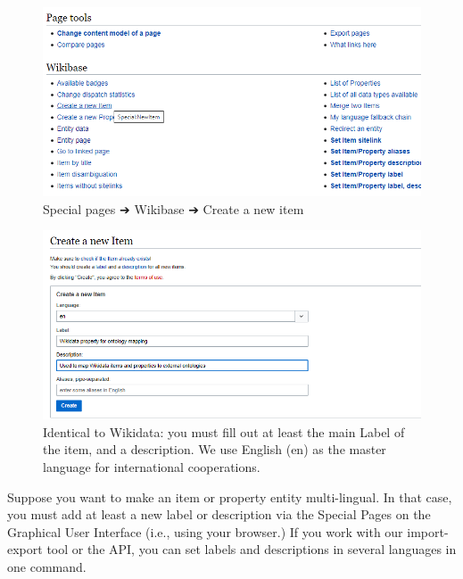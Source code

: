\documentclass[
  letterpaper,
  DIV=11,
  numbers=noendperiod]{scrreprt}
\begin{document}
\begin{figure}[H]

{\centering \includegraphics{png/wikibase/edit/create_new_item-1.png}

}

\caption{Special pages ➔ Wikibase ➔ Create a new item}

\end{figure}%
\begin{figure}[H]

{\centering \includegraphics{png/wikibase/edit/create_new_item-2.png}

}

\caption{Identical to Wikidata: you must fill out at least the main
Label of the item, and a description. We use English (en) as the master
language for international cooperations.}

\end{figure}%

Suppose you want to make an item or property entity multi-lingual. In
that case, you must add at least a new label or description via the
Special Pages on the Graphical User Interface (i.e., using your
browser.) If you work with our import-export tool or the API, you can
set labels and descriptions in several languages in one command.
\end{document}
